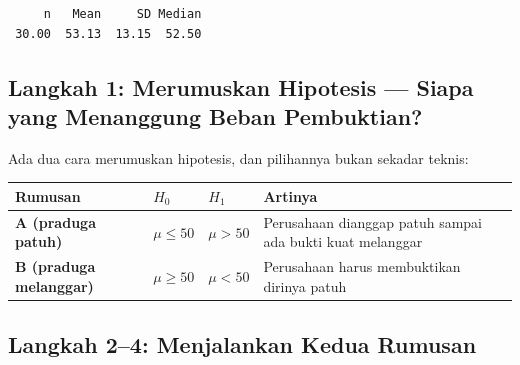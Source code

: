 \documentclass[
  indonesian,
  letterpaper,
]{book}
\newcounter{none} %
\begin{document}
\begin{verbatim}
     n   Mean     SD Median 
 30.00  53.13  13.15  52.50 
\end{verbatim}

\subsection{Langkah 1: Merumuskan Hipotesis --- Siapa yang Menanggung
Beban
Pembuktian?}\label{langkah-1-merumuskan-hipotesis-siapa-yang-menanggung-beban-pembuktian}

Ada dua cara merumuskan hipotesis, dan pilihannya bukan sekadar teknis:

{\def\LTcaptype{none} %
\begin{longtable}[]{@{}
  >{\raggedright\arraybackslash}p{}
  >{\raggedright\arraybackslash}p{}
  >{\raggedright\arraybackslash}p{}
  >{\raggedright\arraybackslash}p{}@{}}
\toprule\noalign{}
\begin{minipage}[b]{\linewidth}\raggedright
Rumusan
\end{minipage} & \begin{minipage}[b]{\linewidth}\raggedright
\(H_0\)
\end{minipage} & \begin{minipage}[b]{\linewidth}\raggedright
\(H_1\)
\end{minipage} & \begin{minipage}[b]{\linewidth}\raggedright
Artinya
\end{minipage} \\
\midrule\noalign{}
\endhead
\bottomrule\noalign{}
\endlastfoot
\textbf{A (praduga patuh)} & \(\mu \le 50\) & \(\mu > 50\) & Perusahaan
dianggap patuh sampai ada bukti kuat melanggar \\
\textbf{B (praduga melanggar)} & \(\mu \ge 50\) & \(\mu < 50\) &
Perusahaan harus membuktikan dirinya patuh \\
\end{longtable}
}

\subsection{Langkah 2--4: Menjalankan Kedua
Rumusan}\label{langkah-24-menjalankan-kedua-rumusan}
\end{document}
